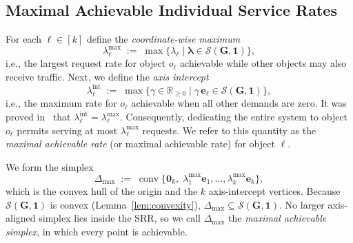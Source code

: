 \documentclass[conference,letterpaper]{IEEEtran}
\newtheorem{proposition}{Proposition}
\begin{document}
\subsection{Maximal Achievable Individual Service Rates}
For each $\ell\in[k]$ define the \emph{coordinate-wise maximum}
\[
   \lambda_{\ell}^{\max}\; :=\;
   \max\bigl\{\lambda_\ell \mid \boldsymbol{\lambda}\in\mathcal S(\boldsymbol G,\boldsymbol 1)\bigr\},
\]
i.e., the largest request rate for object $o_\ell$ achievable while other objects may also receive traffic. Next, we define the \emph{axis intercept}
\[
   \lambda_{\ell}^{\mathrm{int}}\;:=\;
   \max\bigl\{\gamma\in\mathbb R_{\ge0} \mid \gamma\,\boldsymbol e_\ell\in\mathcal S(\boldsymbol G,\boldsymbol 1)\bigr\},
\]
i.e., the maximum rate for $o_\ell$ achievable when all other demands are zero. It was proved in~\cite{SRR:lySV2025} that
\(\lambda_{\ell}^{\mathrm{int}}=\lambda_{\ell}^{\max}\). Consequently, dedicating the entire system to object~$o_\ell$ permits serving at most \(\lambda_{\ell}^{\max}\) requests. We refer to this quantity as the \emph{maximal achievable rate} (or maximal achievable rate) for object \( \ell \). %

We form the simplex
\[
   \Delta_{\max}\;:=\;
   \operatorname{conv}\bigl\{
      \boldsymbol{0}_k,\;
      \lambda_{1}^{\max}\boldsymbol e_1,\dots,
      \lambda_{k}^{\max}\boldsymbol e_k
   \bigr\},
\]
which is the convex hull of the origin and the $k$ axis-intercept vertices. Because $\mathcal S(\boldsymbol G,\boldsymbol 1)$ is convex (Lemma~\ref{lem:convexity}), \(\Delta_{\max}\subseteq\mathcal S(\boldsymbol G,\boldsymbol 1)\). No larger axis-aligned simplex lies inside the SRR, so we call $\Delta_{\max}$ the \emph{maximal achievable simplex}, in which every point is achievable.

\end{document}
